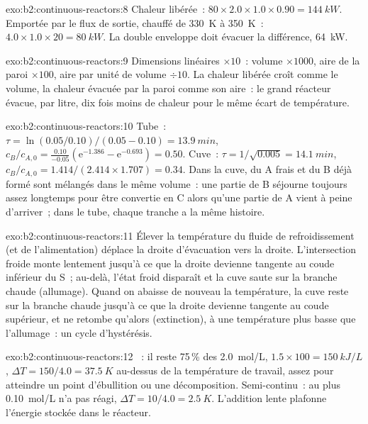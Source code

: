 \begin{solution}{exo:b2:continuous-reactors:8}
Chaleur libérée~: $80 \times 2.0 \times 1.0 \times 0.90 = \qty{144}{kW}$. Emportée par le
flux de sortie, chauffé de \qty{330}{K} à \qty{350}{K}~: $4.0 \times 1.0 \times 20 =
\qty{80}{kW}$. La double enveloppe doit évacuer la différence, \qty{64}{kW}.
\end{solution}

\begin{solution}{exo:b2:continuous-reactors:9}
Dimensions linéaires $\times 10$~: volume $\times 1000$, aire de la paroi $\times 100$, aire
par unité de volume $\div 10$. La chaleur libérée croît comme le volume, la chaleur
évacuée par la paroi comme son aire~: le grand réacteur évacue, par litre,
dix fois moins de chaleur pour le même écart de température.
\end{solution}

\begin{solution}{exo:b2:continuous-reactors:10}
Tube~: $\tau = \ln(0.05/0.10)/(0.05 - 0.10) = \qty{13.9}{min}$, $c_B/c_{A,0} =
\frac{0.10}{-0.05}(\mathrm e^{-1.386} - \mathrm e^{-0.693}) = 0.50$. Cuve~: $\tau =
1/\sqrt{0.005} = \qty{14.1}{min}$, $c_B/c_{A,0} = 1.414/(2.414 \times 1.707) =
0.34$. Dans la cuve, du A frais et du B déjà formé sont mélangés dans le même volume~: une partie
de B séjourne toujours assez longtemps pour être convertie en C alors qu'une partie de A vient à peine
d'arriver~; dans le tube, chaque tranche a la même histoire.
\end{solution}

\begin{solution}{exo:b2:continuous-reactors:11}
Élever la température du fluide de refroidissement (et de l'alimentation) déplace la droite d'évacuation vers la
droite. L'intersection froide monte lentement jusqu'à ce que la droite devienne tangente au
coude inférieur du S~; au-delà, l'état froid disparaît et la cuve saute
sur la branche chaude (allumage). Quand on abaisse de nouveau la température, la cuve reste
sur la branche chaude jusqu'à ce que la droite devienne tangente au coude supérieur, et ne
retombe qu'alors (extinction), à une température plus basse que l'allumage~: un
cycle d'hystérésis.
\end{solution}

\begin{solution}{exo:b2:continuous-reactors:12}
~: il reste 75\,\% des \qty{2.0}{mol/L}, $1.5 \times 100 = \qty{150}{kJ/L}$,
$\Delta T = 150/4.0 = \qty{37.5}{K}$ au-dessus de la température de travail, assez pour
atteindre un point d'ébullition ou une décomposition. Semi-continu~: au plus
\qty{0.10}{mol/L} n'a pas réagi, $\Delta T = 10/4.0 = \qty{2.5}{K}$. L'addition lente
plafonne l'énergie stockée dans le réacteur.
\end{solution}

